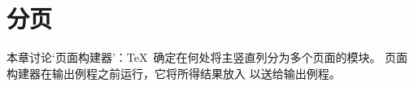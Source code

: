 \documentclass{book}
\begin{document}
\chapter{分页}\label{page:break}


本章讨论`页面构建器'：\TeX\ 确定在何处将主竖直列分为多个页面的模块。
页面构建器在输出例程之前运行，它将所得结果放入  以送给输出例程。
\end{document}
